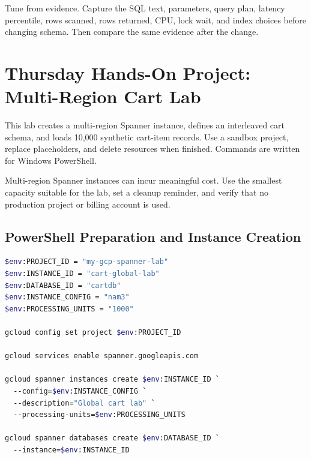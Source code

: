 \begin{tipbox}
Tune from evidence. Capture the SQL text, parameters, query plan, latency percentile, rows scanned, rows returned, CPU, lock wait, and index choices before changing schema. Then compare the same evidence after the change.
\end{tipbox}

\section{Thursday Hands-On Project: Multi-Region Cart Lab}
This lab creates a multi-region Spanner instance, defines an interleaved cart schema, and loads 10,000 synthetic cart-item records. Use a sandbox project, replace placeholders, and delete resources when finished. Commands are written for Windows PowerShell.

\begin{notebox}
Multi-region Spanner instances can incur meaningful cost. Use the smallest capacity suitable for the lab, set a cleanup reminder, and verify that no production project or billing account is used.
\end{notebox}

\subsection{PowerShell Preparation and Instance Creation}
\begin{lstlisting}[language=bash,caption={Creating a multi-region Cloud Spanner instance from PowerShell.}]
$env:PROJECT_ID = "my-gcp-spanner-lab"
$env:INSTANCE_ID = "cart-global-lab"
$env:DATABASE_ID = "cartdb"
$env:INSTANCE_CONFIG = "nam3"
$env:PROCESSING_UNITS = "1000"

gcloud config set project $env:PROJECT_ID

gcloud services enable spanner.googleapis.com

gcloud spanner instances create $env:INSTANCE_ID `
  --config=$env:INSTANCE_CONFIG `
  --description="Global cart lab" `
  --processing-units=$env:PROCESSING_UNITS

gcloud spanner databases create $env:DATABASE_ID `
  --instance=$env:INSTANCE_ID
\end{lstlisting}

